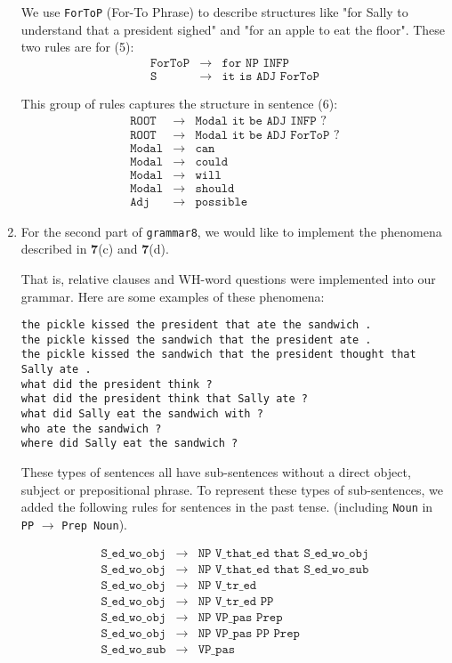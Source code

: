 \documentclass[11pt]{article}
\newcommand{\code}[1]{\texttt{#1}}
\begin{document}
\begin{enumerate}
We use \code{ForToP} (For-To Phrase) to describe structures like "for Sally to understand that a president sighed" and "for an apple to eat the floor". These two rules are for (5):
\begin{eqnarray*}
\code{ForToP} &\to& \code{for NP INFP }\\
\code{S} &\to& \code{it is ADJ ForToP}
\end{eqnarray*}

This group of rules captures the structure in sentence (6):
\begin{eqnarray*}
\code{ROOT} &\to&  \code{Modal it be ADJ INFP ?}\\
\code{ROOT} &\to&  \code{Modal it be ADJ ForToP ?}\\
\code{Modal}  &\to& \code{can}\\
\code{Modal} &\to&  \code{could}\\
\code{Modal} &\to&  \code{will}\\
\code{Modal} &\to&  \code{should}\\
\code{Adj}   &\to&  \code{possible}
\end{eqnarray*}

\item For the second part of \code{grammar8}, we would like to implement the phenomena described in \textbf{7}(c) and \textbf{7}(d).

That is, relative clauses and WH-word questions were implemented into our grammar. Here are some examples of these phenomena:
\begin{lstlisting}
the pickle kissed the president that ate the sandwich .
the pickle kissed the sandwich that the president ate .
the pickle kissed the sandwich that the president thought that Sally ate .
what did the president think ?
what did the president think that Sally ate ?
what did Sally eat the sandwich with ?
who ate the sandwich ?
where did Sally eat the sandwich ?
\end{lstlisting}

These types of sentences all have sub-sentences without a direct object, subject or prepositional phrase. To represent these types of sub-sentences, we added the following rules for sentences in the past tense. (including \code{Noun} in \code{PP} $\to$ \code{Prep Noun}).

\begin{eqnarray*}
\code{S\_ed\_wo\_obj} &\to&  \code{NP V\_that\_ed that S\_ed\_wo\_obj}\\
\code{S\_ed\_wo\_obj} &\to&  \code{NP V\_that\_ed that S\_ed\_wo\_sub}\\
\code{S\_ed\_wo\_obj} &\to&  \code{NP V\_tr\_ed}\\
\code{S\_ed\_wo\_obj} &\to&  \code{NP V\_tr\_ed PP}\\
\code{S\_ed\_wo\_obj} &\to&  \code{NP VP\_pas Prep}\\
\code{S\_ed\_wo\_obj} &\to&  \code{NP VP\_pas PP Prep}\\
\code{S\_ed\_wo\_sub} &\to&  \code{VP\_pas}\\
\end{eqnarray*}


\end{enumerate}
\end{document}
